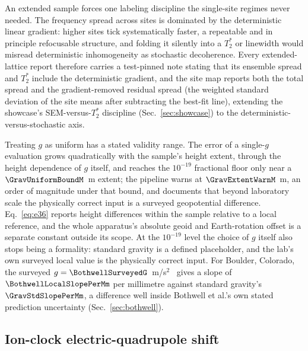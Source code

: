 \documentclass[aps,pra,superscriptaddress,groupedaddress,nofootinbib]{revtex4-2}
\begin{document}
An extended sample forces one labeling discipline the single-site
regimes never needed. The frequency spread across sites is dominated by
the deterministic linear gradient: higher sites tick systematically
faster, a repeatable and in principle refocusable structure, and
folding it silently into a $T_2^*$ or linewidth would misread
deterministic inhomogeneity as stochastic decoherence. Every
extended-lattice report therefore carries a test-pinned note stating
that its ensemble spread and $T_2^*$ include the deterministic
gradient, and the site map reports both the total spread and the
gradient-removed residual spread (the weighted standard deviation of
the site means after subtracting the best-fit line), extending the
showcase's SEM-versus-$T_2^*$ discipline (Sec.~\ref{sec:showcase}) to
the deterministic-versus-stochastic axis.

Treating $g$ as uniform has a stated validity range. The error of a
single-$g$ evaluation grows quadratically with the sample's height
extent, through the height dependence of $g$ itself, and reaches the
$10^{-19}$ fractional floor only near a $\GravUniformBoundM$~m extent;
the pipeline warns at $\GravExtentWarnM$~m, an order of magnitude under
that bound, and documents that beyond laboratory scale the physically
correct input is a surveyed geopotential difference. Eq.~\eqref{eq:e36}
reports height differences within the sample relative to a local
reference, and the whole apparatus's absolute geoid and Earth-rotation
offset is a separate constant outside its scope. At the $10^{-19}$
level the choice of $g$ itself also stops being a formality: standard
gravity is a defined placeholder, and the lab's own surveyed local
value is the physically correct input. For Boulder, Colorado, the
surveyed $g=\BothwellSurveyedG$~m/s$^2$~\cite{vanWestrum2019} gives a
slope of $\BothwellLocalSlopePerMm$ per millimetre against standard
gravity's $\GravStdSlopePerMm$, a difference well inside Bothwell et
al.'s own stated prediction uncertainty (Sec.~\ref{sec:bothwell}).

\subsection{Ion-clock electric-quadrupole shift}
\label{sec:quadrupole}
\end{document}

